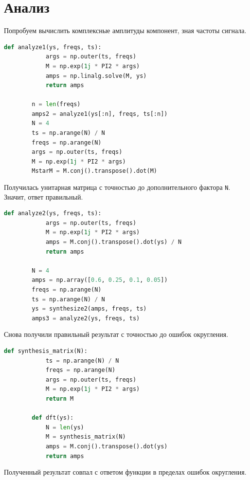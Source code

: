 \documentclass[a4paper, 12pt]{report}
\begin{document}
	\chapter{Анализ}
	Попробуем вычислить комплексные амплитуды компонент, зная частоты сигнала.
	\begin{lstlisting}[language=Python,caption=Применение первой функции для анализа]
		def analyze1(ys, freqs, ts):
			args = np.outer(ts, freqs)
			M = np.exp(1j * PI2 * args)
			amps = np.linalg.solve(M, ys)
			return amps

		n = len(freqs)
		amps2 = analyze1(ys[:n], freqs, ts[:n])
		N = 4
		ts = np.arange(N) / N
		freqs = np.arange(N)
		args = np.outer(ts, freqs)
		M = np.exp(1j * PI2 * args)
		MstarM = M.conj().transpose().dot(M)
	\end{lstlisting}
	Получилась унитарная матрица с точностью до дополнительного фактора \texttt{N}. Значит, ответ правильный.
	\begin{lstlisting}[language=Python,caption=Применение второй функции для анализа]
		def analyze2(ys, freqs, ts):
			args = np.outer(ts, freqs)
			M = np.exp(1j * PI2 * args)
			amps = M.conj().transpose().dot(ys) / N
			return amps

		N = 4
		amps = np.array([0.6, 0.25, 0.1, 0.05])
		freqs = np.arange(N)
		ts = np.arange(N) / N
		ys = synthesize2(amps, freqs, ts)
		amps3 = analyze2(ys, freqs, ts)
	\end{lstlisting}
	Снова получили правильный результат с точностью до ошибок округления.
	\begin{lstlisting}[language=Python,caption=Улучшение функции]
		def synthesis_matrix(N):
			ts = np.arange(N) / N
			freqs = np.arange(N)
			args = np.outer(ts, freqs)
			M = np.exp(1j * PI2 * args)
			return M

		def dft(ys):
			N = len(ys)
			M = synthesis_matrix(N)
			amps = M.conj().transpose().dot(ys)
			return amps
	\end{lstlisting}
	Полученный результат совпал с ответом функции  в пределах ошибок округления.
\end{document}
